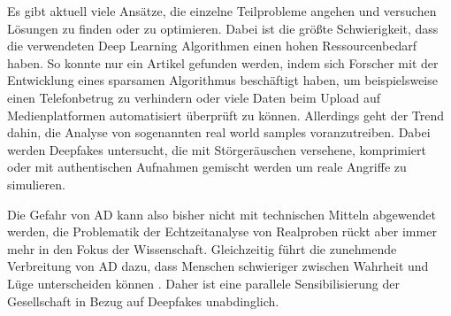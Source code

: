 Es gibt aktuell viele Ansätze, die einzelne Teilprobleme angehen und versuchen Lösungen zu finden oder zu optimieren.
Dabei ist die größte Schwierigkeit, dass die verwendeten Deep Learning Algorithmen einen hohen Ressourcenbedarf haben.
So konnte nur ein Artikel gefunden werden, indem sich Forscher mit der Entwicklung eines sparsamen Algorithmus beschäftigt haben, um beispielsweise einen Telefonbetrug zu verhindern oder viele Daten beim Upload auf Medienplatformen automatisiert überprüft zu können.
Allerdings geht der Trend dahin, die Analyse von sogenannten \glqq{}real world samples\grqq{} voranzutreiben.
Dabei werden Deepfakes untersucht, die mit Störgeräuschen versehene, komprimiert oder mit authentischen Aufnahmen gemischt werden um reale Angriffe zu simulieren.

Die Gefahr von AD kann also bisher nicht mit technischen Mitteln abgewendet werden, die Problematik der Echtzeitanalyse von Realproben rückt aber immer mehr in den Fokus der Wissenschaft.
Gleichzeitig führt die zunehmende Verbreitung von AD dazu, dass Menschen schwieriger zwischen Wahrheit und Lüge unterscheiden können \citep[][]{Godulla2021}.
Daher ist eine parallele Sensibilisierung der Gesellschaft in Bezug auf Deepfakes unabdinglich.
